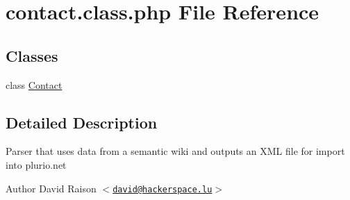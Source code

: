 \hypertarget{contact_8class_8php}{
\section{contact.class.php File Reference}
\label{contact_8class_8php}
}
\subsection*{Classes}
\begin{DoxyCompactItemize}
\item 
class \hyperlink{classContact}{Contact}
\end{DoxyCompactItemize}


\subsection{Detailed Description}
Parser that uses data from a semantic wiki and outputs an XML file for import into plurio.net

\begin{DoxyAuthor}{Author}
David Raison $<$\href{mailto:david@hackerspace.lu}{\tt david@hackerspace.lu}$>$ 
\end{DoxyAuthor}

